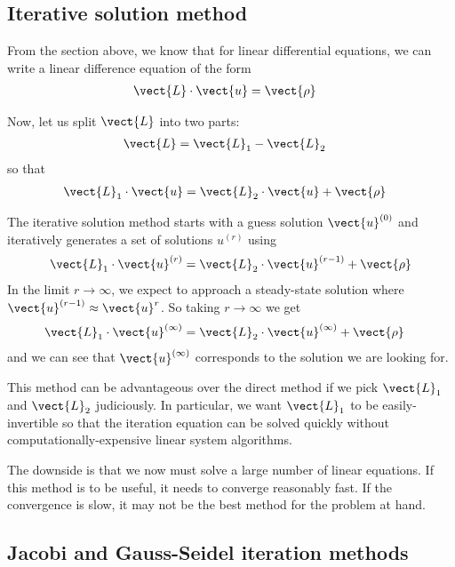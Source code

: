 \documentclass[twocolumn]{myarticle}
\begin{document}
\subsection{Iterative solution method}
\label{subsec:iterative_solution_method}

From the section above, we know that for linear differential equations, we can write a linear difference equation of the form
\begin{align}
    \vect{L} \cdot \vect{u} &= \vect{\rho}
\end{align}

Now, let us split $ \vect{L} $ into two parts:
\begin{align}
    \vect{L} &= \vect{L}_1 - \vect{L}_2
\end{align}
so that
\begin{align}
    \vect{L}_1 \cdot \vect{u} &= \vect{L}_2 \cdot \vect{u} + \vect{\rho}
\end{align}

The iterative solution method starts with a guess solution $ \vect{u}^{(0)} $ and iteratively generates a set of solutions $ u^{(r)} $ using
\begin{align}
    \vect{L}_1 \cdot \vect{u}^{(r)} = \vect{L}_2 \cdot \vect{u}^{(r-1)} + \vect{\rho}
\end{align}
In the limit $ r \to \infty $, we expect to approach a steady-state solution where $ \vect{u}^{(r-1)} \approx \vect{u}^{r} $.
So taking $ r \to \infty $ we get
\begin{align}
    \vect{L}_1 \cdot \vect{u}^{(\infty)} &= \vect{L}_2 \cdot \vect{u}^{(\infty)} + \vect{\rho}
\end{align}
and we can see that $ \vect{u}^{(\infty)} $ corresponds to the solution we are looking for.

This method can be advantageous over the direct method if we pick $ \vect{L}_1 $ and $ \vect{L}_2 $ judiciously.
In particular, we want $ \vect{L}_1 $ to be easily-invertible so that the iteration equation can be solved quickly without computationally-expensive linear system algorithms.

The downside is that we now must solve a large number of linear equations.
If this method is to be useful, it needs to converge reasonably fast.
If the convergence is slow, it may not be the best method for the problem at hand.

\subsection{Jacobi and Gauss-Seidel iteration methods}
\label{subsec:jacobi_and_gauss_seidel_iteration_methods}
\end{document}
